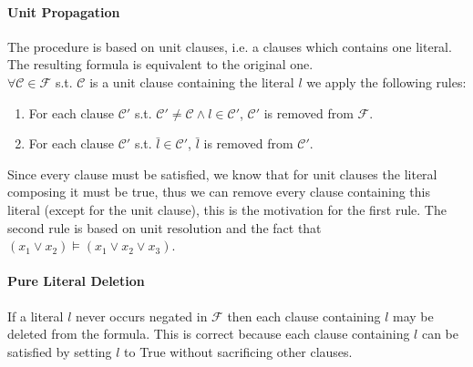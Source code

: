 \documentclass[]{article}
\begin{document}
	\paragraph{Unit Propagation} The procedure is based on unit clauses, i.e. a clauses which contains one literal. The resulting formula is equivalent to the original one.\\
	$\forall \mathcal{C} \in \mathcal{F} $ s.t. $ \mathcal{C} $ is a unit clause containing the literal $l$ we apply the following rules:
	\begin{enumerate}
		\item For each clause $\mathcal{C'} $ s.t. $ \mathcal{C'} \neq \mathcal{C} \land l \in \mathcal{C'} $, $\mathcal{C'} $ is removed from $\mathcal{F} $.
		\item For each clause $\mathcal{C'} $ s.t. $\bar{l} \in \mathcal{C'} $, $\bar{l}$ is removed from $\mathcal{C'} $.
	\end{enumerate}
	Since every clause must be satisfied, we know that for unit clauses the literal composing it must be true, thus we can remove every clause containing this literal (except for the unit clause), this is the motivation for the first rule. The second rule is based on unit resolution and the fact that $ (x_1 \lor x_2) \vDash (x_1 \lor x_2 \lor x_3) $.
	
	\paragraph{Pure Literal Deletion} If a literal $ l $ never occurs negated in $ \mathcal{F} $ then each clause containing $ l $ may be deleted from the formula. This is correct because each clause containing $ l $ can be satisfied by setting $ l $ to True without sacrificing other clauses.
	
\end{document}
